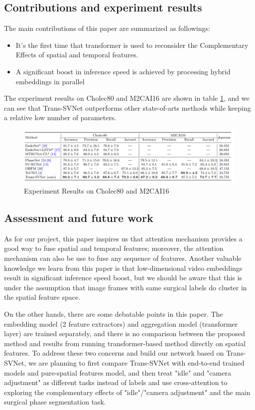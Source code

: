\documentclass[11pt]{article} \usepackage[top=1in, bottom=1in, left=1in, right=1in]{geometry}
\begin{document}
\subsection{Contributions and experiment results}
The main contributions of this paper are summarized as followings:
\begin{itemize}
  \item It's the first time that transformer is used to reconsider the Complementary Effects of spatial and temporal features.
  \item A significant boost in inference speed is achieved by processing hybrid embeddings in parallel
\end{itemize}
The experiment results on Cholec80 and M2CAI16 are shown in table \ref{fig:transsvnet_result}, and we can see that Trans-SVNet outperforms other state-of-arts methods while keeping a relative low number of parameters.
\begin{figure}[H]
  \includegraphics[width=\textwidth]{trans_svnet_3.png}
  \centering
  \caption{Experiment Results on Cholec80 and M2CAI16}
  \label{fig:transsvnet_result}
\end{figure}

\subsection{Assessment and future work}
As for our project, this paper inspires us that attention mechanism provides a good way to fuse spatial and temporal features; moreover, the attention mechanism can also be use to fuse any sequence of features. Another valuable knowledge we learn from this paper is that low-dimensional video embeddings result in significant inference speed boost, but we should be aware that this is under the assumption that image frames with same surgical labels do cluster in the spatial feature space.

\vspace{0.25cm}
\noindent
On the other hands, there are some debatable points in this paper. The embedding model (2 feature extractors) and aggregation model (transformer layer) are trained separately, and there is no comparison between the proposed method and results from running transformer-based method directly on spatial features. To address these two concerns and build our network based on Trans-SVNet, we are planning to first compare Trans-SVNet with end-to-end trained models and pure-spatial features model, and then treat "idle" and "camera adjustment" as different tasks instead of labels and use cross-attention to exploring the complementary effects of "idle"/"camera adjustment" and the main surgical phase segmentation task.

\newpage

\end{document}
